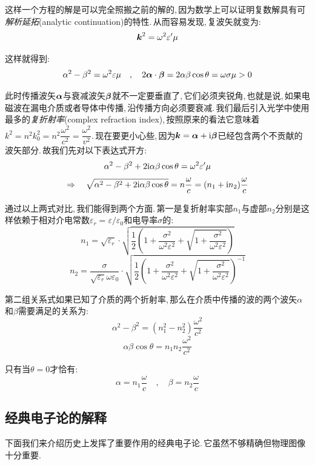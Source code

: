 这样一个方程的解是可以完全照搬之前的解的,\,因为数学上可以证明复数解具有可\emph{解析延拓}(analytic continuation)的特性.\,从而容易发现,\,复波矢就变为:
\[\boldsymbol{k}^2=\omega^2\varepsilon^\prime \mu\]

这样就得到:
\[\alpha^2-\beta^2=\omega^2\varepsilon \mu\quad ,\quad 2\boldsymbol{\alpha}\cdot\boldsymbol{\beta}=2\alpha\beta\cos\theta=\omega\sigma\mu>0\]

此时传播波矢$\boldsymbol{\alpha}$与衰减波矢$\boldsymbol{\beta}$就不一定要垂直了,\,它们必须夹锐角,\,也就是说,\,如果电磁波在漏电介质或者导体中传播,\,沿传播方向必须要衰减.\,我们最后引入光学中使用最多的\emph{复折射率}(complex refraction index),\,按照原来的看法它意味着$k^2=n^2k_0^2=n^2\dfrac{\omega^2}{c^2}=\dfrac{\omega^2}{v^2}$.\,现在要更小心些,\,因为$\boldsymbol{k}=\boldsymbol{\alpha}+{\rm i} \boldsymbol{\beta}$已经包含两个不贡献的波矢部分.\,故我们先对以下表达式开方:
\[\alpha^2-\beta^2+2{\rm i} \alpha\beta\cos\theta=\omega^2\varepsilon^\prime \mu\]
\[\Rightarrow \quad \sqrt{\alpha^2-\beta^2+2{\rm i} \alpha\beta\cos\theta}=n\frac{\omega}{c}=(n_1+{\rm i} n_2)\frac{\omega}{c}\]

通过以上两式对比,\,我们能得到两个方面.\,第一是复折射率实部$n_1$与虚部$n_2$分别是这样依赖于相对介电常数$\varepsilon_r=\varepsilon/\varepsilon_0$和电导率$\sigma$的:
\[n_1=\sqrt{\varepsilon_r}\cdot \sqrt{\frac{1}{2}\left(1+\frac{\sigma^2}{\omega^2\varepsilon^2}+\sqrt{1+\frac{\sigma^2}{\omega^2\varepsilon^2}}\right)}\]
\[n_2=\frac{\sigma}{\sqrt{\varepsilon_r}\omega\varepsilon_0}\cdot\sqrt{\frac{1}{2}\left(1+\frac{\sigma^2}{\omega^2\varepsilon^2}+\sqrt{1+\frac{\sigma^2}{\omega^2\varepsilon^2}}\right)^{-1}}\]

第二组关系式如果已知了介质的两个折射率,\,那么在介质中传播的波的两个波矢$\alpha$和$\beta$需要满足的关系为:
\[\alpha^2-\beta^2=(n_1^2-n_2^2)\frac{\omega^2}{c^2}\]
\[\alpha\beta\cos\theta=n_1n_2\frac{\omega^2}{c^2}\]

只有当$\theta=0$才恰有:
\[\alpha=n_1\frac{\omega}{c}\quad,\quad\beta=n_2\frac{\omega}{c}\]


\subsection{经典电子论的解释}

下面我们来介绍历史上发挥了重要作用的经典电子论.\,它虽然不够精确但物理图像十分重要.

